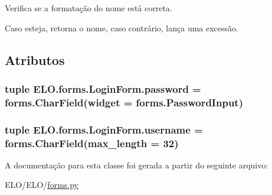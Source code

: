 Verifica se a formatação do nome está correta. 

Caso esteja, retorna o nome, caso contrário, lança uma excessão. 

\subsection{Atributos}
\hypertarget{classELO_1_1forms_1_1LoginForm_a3bc2d5d337bbe87a543b48b52315d199}{
\subsubsection[{password}]{\setlength{\rightskip}{0pt plus 5cm}tuple E\-L\-O.\-forms.\-Login\-Form.\-password = forms.\-Char\-Field(widget = forms.\-Password\-Input)\hspace{0.3cm}{\ttfamily [static]}}}\label{de/da2/classELO_1_1forms_1_1LoginForm_a3bc2d5d337bbe87a543b48b52315d199}
\hypertarget{classELO_1_1forms_1_1LoginForm_aa093b687c878b2b5a6bf52718dac480d}{
\subsubsection[{username}]{\setlength{\rightskip}{0pt plus 5cm}tuple E\-L\-O.\-forms.\-Login\-Form.\-username = forms.\-Char\-Field(max\-\_\-length = 32)\hspace{0.3cm}{\ttfamily [static]}}}\label{de/da2/classELO_1_1forms_1_1LoginForm_aa093b687c878b2b5a6bf52718dac480d}


A documentação para esta classe foi gerada a partir do seguinte arquivo\-:\begin{DoxyCompactItemize}
\item 
E\-L\-O/\-E\-L\-O/\hyperlink{ELO_2forms_8py}{forms.\-py}\end{DoxyCompactItemize}
